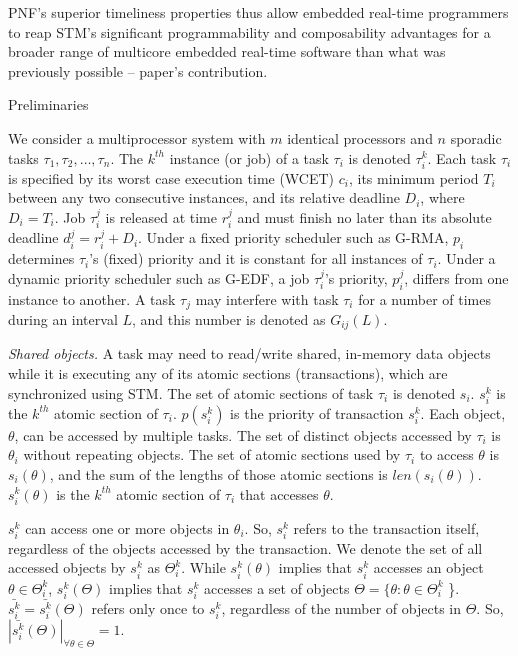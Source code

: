 \documentclass[twocolumn]{article}
\makeatletter
\def\section{\@startsection {section}{1}{\z@}{20pt plus 2pt minus 2pt}
{8pt plus 2pt minus 2pt}{\centering\normalsize\sc
\edef\@svsec{\thesection.\ }}}
\def\thesection{\Roman{section}}
\makeatother
\begin{document}
PNF's superior timeliness properties thus allow embedded real-time programmers to reap STM's significant programmability and composability advantages for a broader range of multicore embedded real-time software than what was previously possible -- paper's contribution. 

\section{Preliminaries}
\label{sec:model}

We consider a multiprocessor system with $m$ identical processors and $n$ sporadic tasks $\tau_1, \tau_2,\ldots, \tau_n$. The $k^{th}$ instance (or job) of a task $\tau_i$ is denoted $\tau_i^k$. Each task $\tau_i$ is specified by its worst case execution time (WCET) $c_i$, its minimum period $T_i$ between any two consecutive instances, and its relative deadline $D_i$, where $D_i=T_i$. Job $\tau_i^j$ is released at time $r_i^j$ and must finish no later than its absolute deadline $d_i^j=r_i^j+D_i$. Under a fixed priority scheduler such as G-RMA, $p_i$ determines $\tau_i$'s (fixed) priority and it is constant for all instances of $\tau_i$. Under a dynamic priority scheduler such as G-EDF, a job $\tau_i^j$'s priority, $p_i^j$, differs from one instance to another. 
A task $\tau_j$ may interfere with task $\tau_i$ for a number of times during an interval $L$, and this number is denoted as $G_{ij}(L)$. 


\textit{Shared objects.}
 A task may need to read/write shared, in-memory data objects while it is executing any of its atomic sections (transactions), which are synchronized using STM. 
The set of atomic sections of task $\tau_i$ is denoted $s_i$. $s_i^k$ is the $k^{th}$ atomic section of $\tau_i$. $p(s_i^k)$ is the priority of transaction $s_i^k$. Each object, $\theta$, can be accessed by multiple tasks. The set of distinct objects accessed by $\tau_i$ is $\theta_i$ without repeating objects.
The set of atomic sections used by $\tau_i$ to access $\theta$ is $s_i(\theta)$, and the sum of the lengths of those atomic sections is $len(s_i(\theta))$. $s_i^k(\theta)$ is the $k^{th}$ atomic section of $\tau_i$ that accesses $\theta$.

 $s_i^k$ can access one or more objects in $\theta_i$. So, $s_i^k$ refers to the transaction itself, regardless of the objects accessed by the transaction. We denote the set of all accessed objects by $s_i^k$ as $\Theta_i^k$. While $s_i^k(\theta)$ implies that $s_i^k$ accesses an object $\theta \in \Theta_i^k$, $s_i^k(\Theta)$ implies that $s_i^k$ accesses a set of objects $\Theta=\{\theta : \theta \in \Theta_i^k$ \}. $\bar{s_i^k}=\bar{s_i^k}(\Theta)$ refers only once to $s_i^k$, regardless of the number of objects in $\Theta$. So, $|\bar{s_i^k}(\Theta)|_{\forall \theta \in \Theta}=1$.
\end{document}
